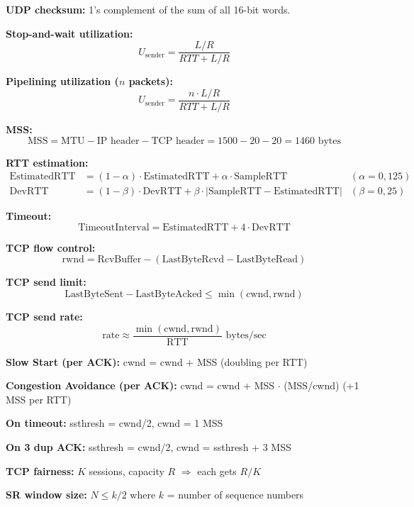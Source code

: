 \begin{formulabox}

\textbf{UDP checksum:} 1's complement of the sum of all 16-bit words.

\textbf{Stop-and-wait utilization:}
\[
U_{\text{sender}} = \frac{L/R}{RTT + L/R}
\]

\textbf{Pipelining utilization ($n$ packets):}
\[
U_{\text{sender}} = \frac{n \cdot L/R}{RTT + L/R}
\]

\textbf{MSS:}
\[
\text{MSS} = \text{MTU} - \text{IP header} - \text{TCP header} = 1500 - 20 - 20 = 1460 \text{ bytes}
\]

\textbf{RTT estimation:}
\begin{align*}
\text{EstimatedRTT} &= (1 - \alpha) \cdot \text{EstimatedRTT} + \alpha \cdot \text{SampleRTT} & (\alpha = 0{,}125) \\
\text{DevRTT} &= (1 - \beta) \cdot \text{DevRTT} + \beta \cdot |\text{SampleRTT} - \text{EstimatedRTT}| & (\beta = 0{,}25)
\end{align*}

\textbf{Timeout:}
\[
\text{TimeoutInterval} = \text{EstimatedRTT} + 4 \cdot \text{DevRTT}
\]

\textbf{TCP flow control:}
\[
\text{rwnd} = \text{RcvBuffer} - (\text{LastByteRcvd} - \text{LastByteRead})
\]

\textbf{TCP send limit:}
\[
\text{LastByteSent} - \text{LastByteAcked} \leq \min(\text{cwnd}, \text{rwnd})
\]

\textbf{TCP send rate:}
\[
\text{rate} \approx \frac{\min(\text{cwnd}, \text{rwnd})}{\text{RTT}} \text{ bytes/sec}
\]

\textbf{Slow Start (per ACK):} cwnd = cwnd + MSS \quad (doubling per RTT)

\textbf{Congestion Avoidance (per ACK):} cwnd = cwnd + MSS $\cdot$ (MSS/cwnd) \quad (+1 MSS per RTT)

\textbf{On timeout:} ssthresh = cwnd/2, \quad cwnd = 1 MSS

\textbf{On 3 dup ACK:} ssthresh = cwnd/2, \quad cwnd = ssthresh + 3 MSS

\textbf{TCP fairness:} $K$ sessions, capacity $R$ $\Rightarrow$ each gets $R/K$

\textbf{SR window size:} $N \leq k/2$ where $k$ = number of sequence numbers

\end{formulabox}
